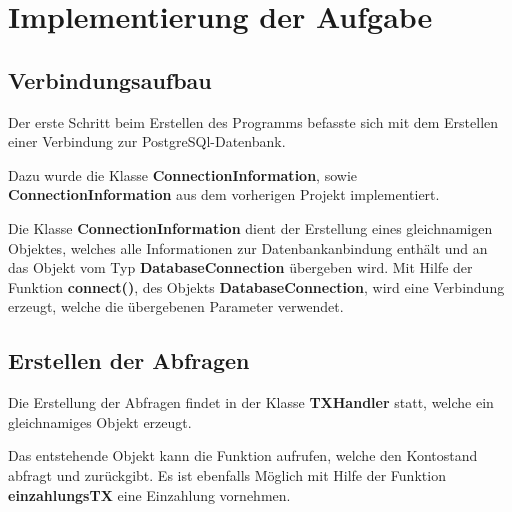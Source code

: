 \section{Implementierung der Aufgabe}

\subsection{Verbindungsaufbau}
Der erste Schritt beim Erstellen des Programms befasste sich mit dem Erstellen
einer Verbindung zur PostgreSQl-Datenbank. 

Dazu wurde die Klasse \textbf{ConnectionInformation}, sowie
\textbf{ConnectionInformation} aus dem vorherigen Projekt implementiert. 

Die Klasse \textbf{ConnectionInformation} dient der Erstellung eines gleichnamigen
Objektes, welches alle Informationen zur Datenbankanbindung enthält und an das
Objekt vom Typ \textbf{DatabaseConnection} übergeben wird. Mit Hilfe der Funktion
\textbf{connect()}, des Objekts \textbf{DatabaseConnection}, wird eine Verbindung
erzeugt, welche die übergebenen Parameter verwendet.

\subsection{Erstellen der Abfragen}
Die Erstellung der Abfragen findet in der Klasse \textbf{TXHandler} statt, welche
ein gleichnamiges Objekt erzeugt. 

Das entstehende Objekt kann die Funktion  aufrufen, welche den
Kontostand abfragt und zurückgibt. Es ist ebenfalls Möglich mit Hilfe der
Funktion \textbf{einzahlungsTX} eine Einzahlung vornehmen. 

